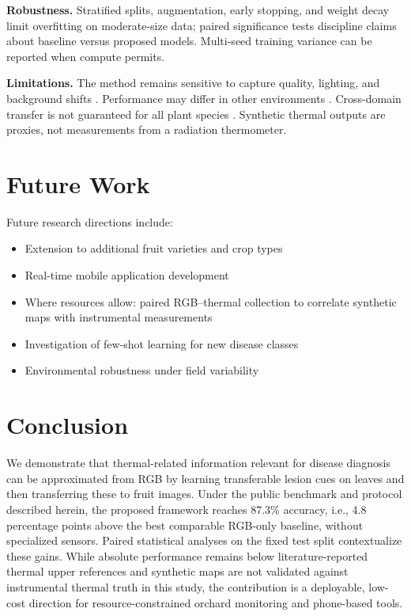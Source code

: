 \documentclass[conference]{IEEEtran}
\begin{document}
\textbf{Robustness.} Stratified splits, augmentation, early stopping, and weight decay limit overfitting on moderate-size data; paired significance tests discipline claims about baseline versus proposed models. Multi-seed training variance can be reported when compute permits.

\textbf{Limitations.} The method remains sensitive to capture quality, lighting, and background shifts \cite{kouidri2021}. Performance may differ in other environments \cite{furbank2011}. Cross-domain transfer is not guaranteed for all plant species \cite{weiss2016}. Synthetic thermal outputs are proxies, not measurements from a radiation thermometer.

\section{Future Work}
Future research directions include:
\begin{itemize}
    \item Extension to additional fruit varieties and crop types
    \item Real-time mobile application development
    \item Where resources allow: paired RGB--thermal collection to correlate synthetic maps with instrumental measurements \cite{zhai2020}
    \item Investigation of few-shot learning for new disease classes
    \item Environmental robustness under field variability
\end{itemize}

\section{Conclusion}
We demonstrate that thermal-related information relevant for disease diagnosis can be approximated from RGB by learning transferable lesion cues on leaves and then transferring these to fruit images. Under the public benchmark and protocol described herein, the proposed framework reaches 87.3\% accuracy, i.e., 4.8 percentage points above the best comparable RGB-only baseline, without specialized sensors. Paired statistical analyses on the fixed test split contextualize these gains. While absolute performance remains below literature-reported thermal upper references and synthetic maps are not validated against instrumental thermal truth in this study, the contribution is a deployable, low-cost direction for resource-constrained orchard monitoring and phone-based tools. 
\end{document}
